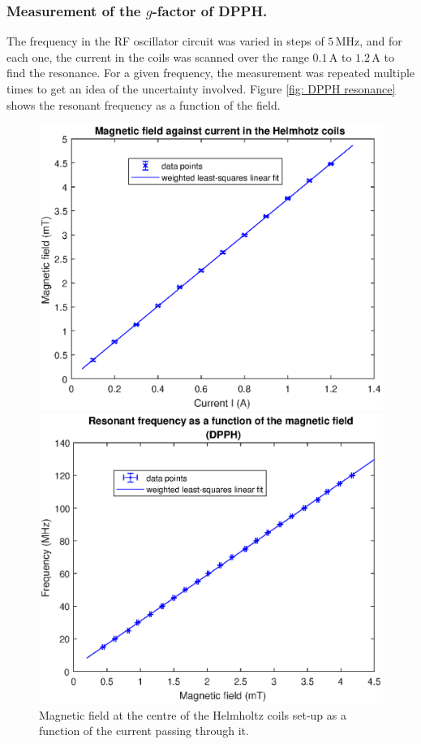 \documentclass[a4paper]{jpconf}
\numberwithin{equation}{section}
\begin{document}
\subsubsection{Measurement of the $g$-factor of DPPH.}
The frequency in the RF oscillator circuit was varied in steps of $5 \, \si{\mega\hertz}$, and for each one, the current in the coils was scanned over the range $0.1 \, \si{\ampere}$ to $1.2 \, \si{\ampere}$ to find the resonance. For a given frequency, the measurement was repeated multiple times to get an idea of the uncertainty involved. Figure \ref{fig: DPPH resonance} shows the resonant frequency as a function of the field.

\begin{figure}[htbp]
	\begin{minipage}[b]{2.9in}
		\includegraphics[scale=0.59]{ESR_calibration.eps}
		\caption{Magnetic field at the centre of the Helmholtz coils set-up as a function of the current passing through it.}
		\label{fig: HC calibration curve}
	\end{minipage}
    \hspace{1.5pc}
	\begin{minipage}[b]{3in}
		\includegraphics[scale=0.6]{DPPH.eps}

\end{minipage}
\end{figure}
\end{document}
